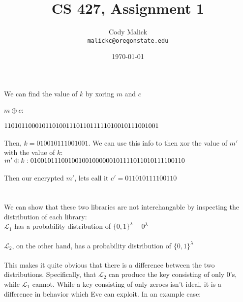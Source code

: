 \documentclass[10pt,letterpaper]{article}
\begin{document}
  \title{CS 427, Assignment 1}
  \author{Cody Malick\\
  \texttt{malickc@oregonstate.edu}}
  \date{\today}
  \maketitle

\section{}
	We can find the value of $k$ by xoring $m$ and $c$\\\\
	$m \oplus c:$\\\\
	$110101100010110\\
	100111011011111\\
	\\
	010010111001001$\\\\
	\noindent Then, $k=010010111001001$. We can use this info to then xor
	the value of $m'$ with the value of $k$:\\
	
	$m' \oplus k:\\\\
	010010111001001\\
	001000000101111\\
	\\
	011010111100110$\\\\
	
	\noindent Then our encrypted $m'$, lets call it $c' = 011010111100110$

\section{}
	We can show that these two libraries are not interchangable by
	inspecting the distribution of each library:\\

	$\mathcal{L}_1$ has a probability distribution of
	$\{0,1\}^\lambda - 0^\lambda$\\\\

	$\mathcal{L}_2$, on the other hand, has a probability distribution of
	$\{0,1\}^\lambda$\\\\

	This makes it quite obvious that there is a difference between the two
	distributions. Specifically, that $\mathcal{L}_2$ can produce the key
	consisting of only 0's, while $\mathcal{L}_1$ cannot. While a key
	consisting of only zeroes isn't ideal, it is a difference in behavior
	which Eve can exploit. In an example case:\\
\end{document}

